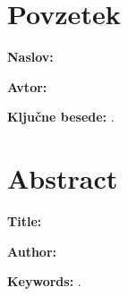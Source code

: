 \pagestyle{empty}
\def\thepage{}%
\tableofcontents
{}

\clearemptydoublepage

\chapter*{Povzetek}

\noindent
\textbf{Naslov:} \ttitle
\bigskip

\noindent
\textbf{Avtor:} \tauthor
\bigskip

\noindent
\tpovzetek

\bigskip

\noindent
\textbf{Ključne besede:} \tkeywords.
\clearemptydoublepage

\chapter*{Abstract}

\noindent
\textbf{Title:} \ttitleEn
\bigskip

\noindent
\textbf{Author:} \tauthor
\bigskip

\noindent
\tabstract
\bigskip

\noindent
\textbf{Keywords:} \tkeywordsEn. 
\clearemptydoublepage